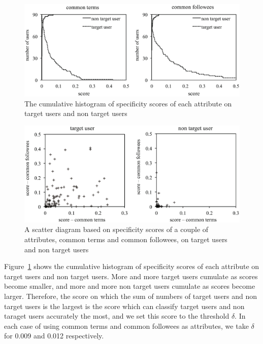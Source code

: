 {\footnotesize
\begin{figure}[t]
\begin{center}
\includegraphics[width=14cm]{images/cumulativehistogram.eps}
 \caption{The cumulative histogram of specificity scores of each
 attribute on target users and non target users}
\label{fig:cumulativehistogram}
\end{center}
\end{figure}
}

{\footnotesize
\begin{figure}[t]
\begin{center}
\includegraphics[width=14cm]{images/distribution.eps}
 \caption{A scatter diagram based on specificity scores of a couple of
 attributes, common terms and common followees, on target users and non
 target users}
\label{fig:distribution}
\end{center}
\end{figure}
}

Figure~\ref{fig:cumulativehistogram} shows the cumulative histogram of
specificity scores of each attribute on target users and non target
users.  More and more target users cumulate as scores become smaller,
and more and more non target users cumulate as scores become larger.
Therefore, the score on which the sum of numbers of target users and non
target users is the largest is the score which can classify target
users and non taraget users accurately the most, and we set this score
to the threshold $\delta$.  In each case of using common terms and
common followees as attributes, we take $\delta$ for 0.009 and 0.012
respectively.

